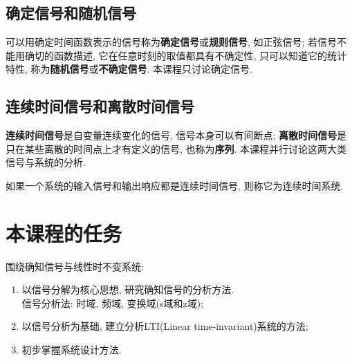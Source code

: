     \subsection{确定信号和随机信号}

    可以用确定时间函数表示的信号称为\textbf{确定信号}或\textbf{规则信号}, 如正弦信号; 若信号不能用确切的函数描述, 它在任意时刻的取值都具有不确定性, 只可以知道它的统计特性, 称为\textbf{随机信号}或\textbf{不确定信号}. 本课程只讨论确定信号.

    \subsection{连续时间信号和离散时间信号}

    \textbf{连续时间信号}是自变量连续变化的信号, 信号本身可以有间断点; \textbf{离散时间信号}是只在某些离散的时间点上才有定义的信号, 也称为\textbf{序列}. 本课程并行讨论这两大类信号与系统的分析.

    如果一个系统的输入信号和输出响应都是连续时间信号, 则称它为连续时间系统.

\section{本课程的任务}

    围绕确知信号与线性时不变系统:
    \begin{enumerate}
        \item 以信号分解为核心思想, 研究确知信号的分析方法. \\
            信号分析法: 时域, 频域, 变换域(s域和z域);
        \item 以信号分析为基础, 建立分析LTI(Linear time-invariant)系统的方法;
        \item 初步掌握系统设计方法.
    \end{enumerate}

